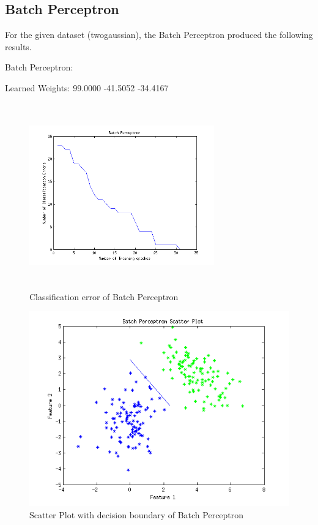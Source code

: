 \documentclass[12pt]{article}
\begin{document}
\subsection{Batch Perceptron}

For the given dataset (twogaussian), the Batch Perceptron produced the following results.

Batch Perceptron:

Learned Weights:
   99.0000
  -41.5052
  -34.4167

\begin{figure}[htbp]
  \includegraphics[width=80mm,height=80mm]{img/batch_errors.png}
  \caption{Classification error of Batch Perceptron}
\end{figure}

\begin{figure}[htbp]
  \includegraphics{img/batch_scatterplot.png}
  \caption{Scatter Plot with decision boundary of Batch Perceptron}
\end{figure}
 
\end{document}
